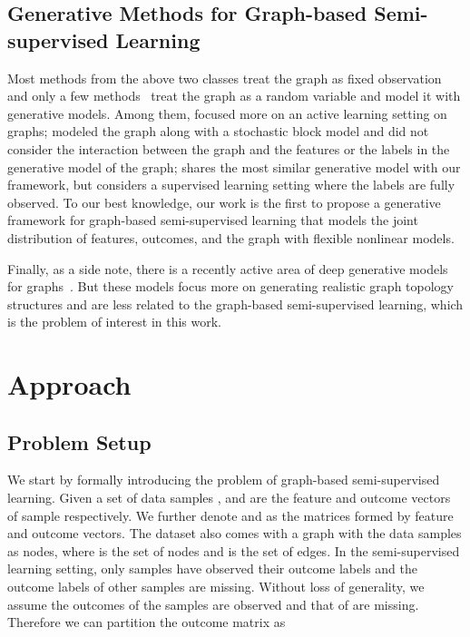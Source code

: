 \documentclass{article}
\begin{document}
\subsection{Generative Methods for Graph-based Semi-supervised Learning}

Most methods from the above two classes treat the graph as fixed observation and only a few methods~\cite{ng2018bayesian,zhang2018bayesian,liu2019statistical} treat the graph as a random variable and model it with generative models. Among them, \citet{ng2018bayesian} focused more on an active learning setting on graphs; \citet{zhang2018bayesian} modeled the graph along with a stochastic block model and did not consider the interaction between the graph and the features or the labels in the generative model of the graph; \citet{liu2019statistical} shares the most similar generative model with our framework, but considers a supervised learning setting where the labels are fully observed. To our best knowledge, our work is the first to propose a generative framework for graph-based semi-supervised learning that models the joint distribution of features, outcomes, and the graph with flexible nonlinear models. 

Finally, as a side note, there is a recently active area of deep generative models for graphs~\cite{kipf2016variational,de2018molgan}. But these models focus more on generating realistic graph topology structures and are less related to the graph-based semi-supervised learning, which is the problem of interest in this work.

 \section{Approach}
\label{sec:approach}

\subsection{Problem Setup}
We start by formally introducing the problem of graph-based semi-supervised learning. Given a set of data samples ,  and  are the feature and outcome vectors of sample  respectively. We further denote  and  as the matrices formed by feature and outcome vectors. The dataset also comes with a graph  with the data samples as nodes, where  is the set of nodes and  is the set of edges. In the semi-supervised learning setting, only  samples have observed their outcome labels and the outcome labels of other samples are missing. Without loss of generality, we assume the outcomes of the samples  are observed and that of  are missing. Therefore we can partition the outcome matrix as 
\end{document}
